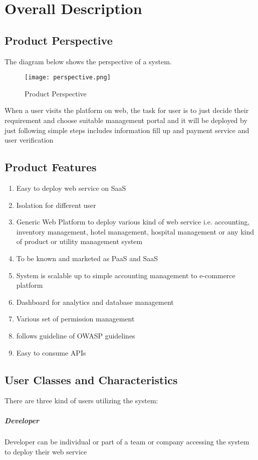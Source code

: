 \documentclass{report}
\begin{document}
\chapter{Overall Description}

\section{Product Perspective}
\label{product_perspective}
The diagram below shows the perspective of a system.
\begin{figure}[H]
\centering	
\texttt{[image: perspective.png]}
\caption{Product Perspective}
\end{figure}
When a user visits the platform on web, the task for user is to just decide their requirement and choose suitable management portal and it will be deployed by just following simple steps includes information fill up and payment service and user verification

\section{Product Features}
\begin{enumerate}
	\item Easy to deploy web service on SaaS
	\item Isolation for different user
	\item Generic Web Platform to deploy various kind of web service i.e. accounting, inventory management, hotel management, hospital management or any kind of product or utility management system
	\item To be known and marketed as PaaS and SaaS
	\item System is scalable up to simple accounting management to e-commerce platform
	\item Dashboard for analytics and database management
	\item Various set of permission management
	\item follows guideline of OWASP guidelines
	\item Easy to consume APIs
\end{enumerate}

\section{User Classes and Characteristics}
There are three kind of users utilizing the system:
\paragraph[developerRole]{Developer} Developer can be individual or part of a team or company accessing the system to deploy their web service
\end{document}

